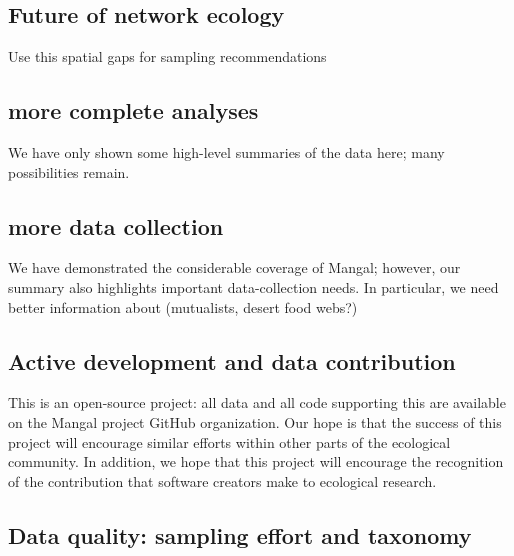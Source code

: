 \hypertarget{future-of-network-ecology}{%
\subsection{Future of network ecology}\label{future-of-network-ecology}}

Use this spatial gaps for sampling recommendations

\hypertarget{more-complete-analyses}{%
\subsection{more complete analyses}\label{more-complete-analyses}}

We have only shown some high-level summaries of the data here; many
possibilities remain.

\hypertarget{more-data-collection}{%
\subsection{more data collection}\label{more-data-collection}}

We have demonstrated the considerable coverage of Mangal; however, our
summary also highlights important data-collection needs. In particular,
we need better information about (mutualists, desert food webs?)

\hypertarget{active-development-and-data-contribution}{%
\subsection{Active development and data
contribution}\label{active-development-and-data-contribution}}

This is an open-source project: all data and all code supporting this
are available on the Mangal project GitHub organization. Our hope is
that the success of this project will encourage similar efforts within
other parts of the ecological community. In addition, we hope that this
project will encourage the recognition of the contribution that software
creators make to ecological research.

\hypertarget{data-quality-sampling-effort-and-taxonomy}{%
\subsection{Data quality: sampling effort and
taxonomy}\label{data-quality-sampling-effort-and-taxonomy}}

